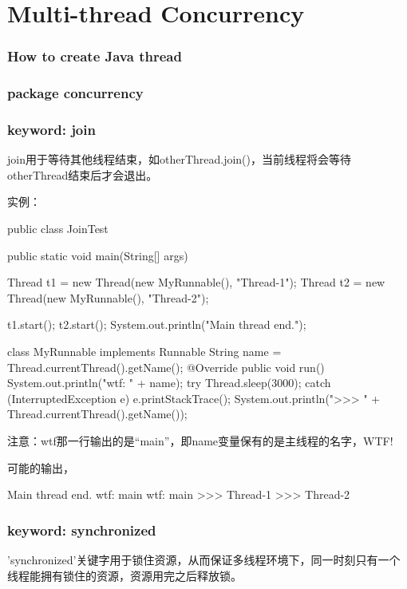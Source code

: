 \documentclass[a4paper,11pt]{article}
\begin{document}
\part[Multi-thread and Concurrency]{Multi-thread Concurrency}
\section[How to create Java thread]{How to create Java thread}

\section[package: concurrency]{package concurrency}

\section[keyword: join]{keyword: join}
join用于等待其他线程结束，如otherThread.join()，当前线程将会等待
otherThread结束后才会退出。

实例：

\begin{javacode}
public class JoinTest {
  public static void main(String[] args) {
    Thread t1 = new Thread(new MyRunnable(), "Thread-1");
    Thread t2 = new Thread(new MyRunnable(), "Thread-2");

    t1.start();
    t2.start();
    System.out.println("Main thread end.");
  }
}

class MyRunnable implements Runnable {
  String name = Thread.currentThread().getName();
  @Override
  public void run() {
    System.out.println("wtf: " + name);
    try {
      Thread.sleep(3000);
    } catch (InterruptedException e) {
      e.printStackTrace();
    }
    System.out.println(">>> " + Thread.currentThread().getName());
  }
}
\end{javacode}

注意：wtf那一行输出的是“main”，即name变量保有的是主线程的名字，WTF!

可能的输出，

\begin{bashcode}
Main thread end.
wtf: main
wtf: main
>>> Thread-1
>>> Thread-2
\end{bashcode}

\section[keyword: synchronized]{keyword: synchronized}
'synchronized'关键字用于锁住资源，从而保证多线程环境下，同一时刻只有一个
线程能拥有锁住的资源，资源用完之后释放锁。
\end{document}
